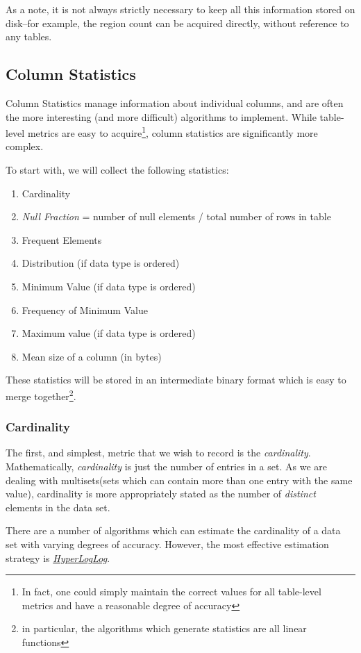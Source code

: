 As a note, it is not always strictly necessary to keep all this information stored on disk--for example, the region count can be acquired directly, without reference to any tables.

\subsection{Column Statistics}
Column Statistics manage information about individual columns, and are often the more interesting (and more difficult) algorithms to implement. While table-level metrics are easy to acquire\footnote{In fact, one could simply maintain the correct values for all table-level metrics and have a reasonable degree of accuracy}, column statistics are significantly more complex. 

To start with, we will collect the following statistics:

\begin{enumerate}
				\item Cardinality
				\item \emph{Null Fraction} = number of null elements / total number of rows in table
				\item Frequent Elements
				\item Distribution (if data type is ordered)
				\item Minimum Value (if data type is ordered)
				\item Frequency of Minimum Value
				\item Maximum value (if data type is ordered)
				\item Mean size of a column (in bytes)
\end{enumerate}

These statistics will be stored in an intermediate binary format which is easy to merge together\footnote{in particular, the algorithms which generate statistics are all linear functions}.

\subsubsection{Cardinality}
The first, and simplest, metric that we wish to record is the \emph{cardinality}. Mathematically, \emph{cardinality} is just the number of entries in a set. As we are dealing with multisets(sets which can contain more than one entry with the same value), cardinality is more appropriately stated as the number of \emph{distinct} elements in the data set. 

There are a number of algorithms which can estimate the cardinality of a data set with varying degrees of accuracy. However, the most effective estimation strategy is \hyperref[sec:HyperLogLog]{\emph{HyperLogLog}}\cite{Flajolet07hyperloglog:the}. 

